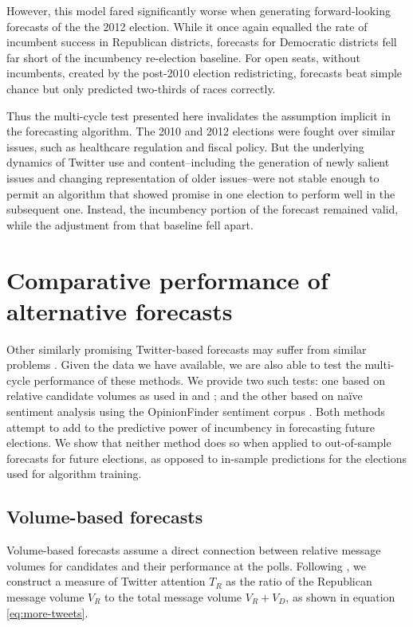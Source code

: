 \documentclass{sig-alternate-2013}
\begin{document}
However, this model fared significantly worse when generating
forward-looking forecasts of the the 2012 election. While it once
again equalled the rate of incumbent success in Republican districts,
forecasts for Democratic districts fell far short of the incumbency
re-election baseline. For open seats, without incumbents, created by
the post-2010 election redistricting, forecasts beat simple chance but
only predicted two-thirds of races correctly.

Thus the multi-cycle test presented here invalidates the assumption
implicit in the forecasting algorithm. The 2010 and 2012 elections
were fought over similar issues, such as healthcare regulation and
fiscal policy. But the underlying dynamics of Twitter use and
content--including the generation of newly salient issues and changing
representation of older issues--were not stable enough to permit an
algorithm that showed promise in one election to perform well in the
subsequent one. Instead, the incumbency portion of the forecast
remained valid, while the adjustment from that baseline fell apart.

\section{Comparative performance of alternative forecasts}
\label{sec:multi-cycle-forecast-1}

Other similarly promising Twitter-based forecasts may suffer from
similar problems \cite{gayo2011limits}. Given the data we have
available, we are also able to test the multi-cycle performance of
these methods. We provide two such tests: one based on relative
candidate volumes as used in \cite{tumasjan2010election} and
\cite{digrazia2013}; and the other based on na\"ive sentiment analysis
using the OpinionFinder sentiment corpus
\cite{wilson2005opinionfinder}. Both methods attempt to add to the
predictive power of incumbency in forecasting future elections. We
show that neither method does so when applied to out-of-sample
forecasts for future elections, as opposed to in-sample predictions
for the elections used for algorithm training.

\subsection{Volume-based forecasts}
\label{sec:volume-based-forec}

Volume-based forecasts assume a direct connection between relative
message volumes for candidates and their performance at the
polls. Following \cite{digrazia2013}, we construct a measure of
Twitter attention $T_R$ as the ratio of the Republican message volume $V_R$
to the total message volume $V_R + V_D$, as shown in equation
\ref{eq:more-tweets}. 
\end{document}
